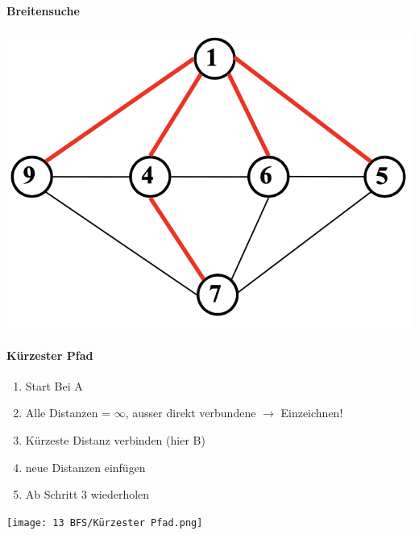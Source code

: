 \paragraph{Breitensuche}
\begin{center}
    \includegraphics[scale=.25]{graphic/13 BFS/breitensuche.png}
\end{center}

\paragraph{Kürzester Pfad}
\begin{enumerate}
    \item Start Bei A
    \item Alle Distanzen = $\infty$, ausser direkt verbundene $\rightarrow$ Einzeichnen!
    \item Kürzeste Distanz verbinden (hier B)
    \item neue Distanzen einfügen
    \item Ab Schritt 3 wiederholen
\end{enumerate}
\begin{center}
    \texttt{[image: 13 BFS/Kürzester Pfad.png]}
\end{center}
\newpage